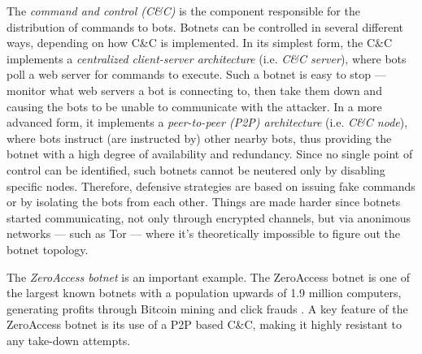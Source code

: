 The \textit{command and control (C\&C)} is the component responsible for the distribution of commands to bots. Botnets can be controlled in several different ways, depending on how C\&C is implemented. In its simplest form, the C\&C implements a \textit{centralized client-server architecture} (i.e. \textit{C\&C server}), where bots poll a web server for commands to execute. Such a botnet is easy to stop — monitor what web servers a bot is connecting to, then take them down and causing the bots to be unable to communicate with the attacker. In a more advanced form, it implements a \textit{peer-to-peer (P2P) architecture} (i.e. \textit{C\&C node}), where bots instruct (are instructed by) other nearby bots, thus providing the botnet with a high degree of availability and redundancy. Since no single point of control can be identified, such botnets cannot be neutered only by disabling specific nodes. Therefore, defensive strategies are based on issuing fake commands or by isolating the bots from each other. Things are made harder since botnets started communicating, not only through encrypted channels, but via anonimous networks — such as Tor — where it's theoretically impossible to figure out the botnet topology.

The \textit{ZeroAccess botnet} is an important example. The ZeroAccess botnet is one of the largest known botnets with a population upwards of 1.9 million computers, generating profits through Bitcoin mining and click frauds \cite{zeroaccess-symantec-blog,zeroaccess-symantec-definition}.
A key feature of the ZeroAccess botnet is its use of a P2P based C\&C, making it highly resistant to any take-down attempts.
